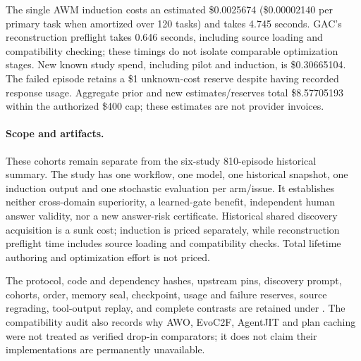 The single AWM induction costs an estimated \$0.0025674 (\$0.00002140 per
primary task when amortized over 120 tasks) and takes 4.745 seconds. GAC's
reconstruction preflight takes 0.646 seconds, including source loading and
compatibility checking; these timings do not isolate comparable optimization
stages. New known study spend, including pilot and induction, is \$0.30665104.
The failed episode retains a \$1 unknown-cost reserve despite having recorded
response usage. Aggregate prior and new estimates/reserves total \$8.57705193
within the authorized \$400 cap; these estimates are not provider invoices.

\paragraph{Scope and artifacts.}
These cohorts remain separate from the six-study 810-episode historical
summary. The study has one workflow, one model, one historical snapshot, one
induction output and one stochastic evaluation per arm/issue. It establishes
neither cross-domain superiority, a learned-gate benefit, independent human
answer validity, nor a new answer-risk certificate. Historical shared discovery
acquisition is a sunk cost; induction is priced separately, while reconstruction
preflight time includes source loading and compatibility checks. Total lifetime
authoring and optimization effort is not priced.

The protocol, code and dependency hashes, upstream pins, discovery prompt,
cohorts, order, memory seal, checkpoint, usage and failure reserves, source
regrading, tool-output replay, and complete contrasts are retained under
. The compatibility audit also records
why AWO, EvoC2F, AgentJIT and plan caching were not treated as verified drop-in
comparators; it does not claim their implementations are permanently unavailable.
